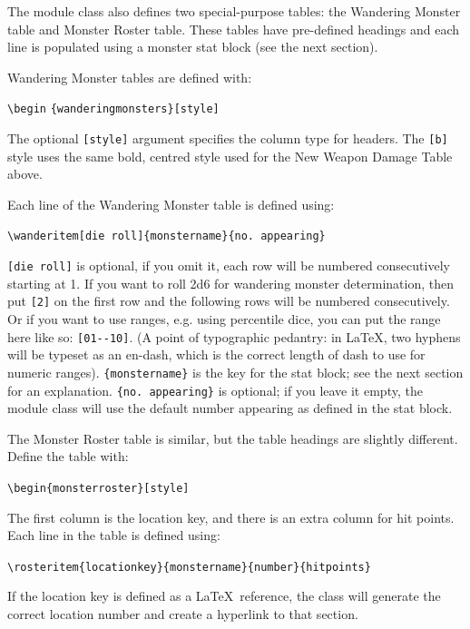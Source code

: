 \documentclass[letterpaper,serif]{module}
\begin{document}
\vspace{1em}\noindent The module class also defines two special-purpose tables: the Wandering Monster table and Monster Roster table. These tables
have pre-defined headings and each line is populated using a monster stat block (see the next section).

Wandering Monster tables are defined with:
\begin{statblockfreestyle}
\verb|\begin| \verb|{wanderingmonsters}[style]|
\end{statblockfreestyle}
The optional \verb|[style]| argument specifies the column type for headers. The \verb|[b]| style uses the same bold,
centred style used for the New Weapon Damage Table above.

Each line of the Wandering Monster table is defined using:
\begin{statblockfreestyle}
\noindent \verb|\wanderitem[die roll]{monstername}{no. appearing}|
\end{statblockfreestyle}
\verb|[die roll]| is optional, if you omit it, each row will be numbered consecutively starting at 1. If you want to
roll 2d6 for wandering monster determination, then put \verb|[2]| on the first row and the following rows will be numbered
consecutively. Or if you want to use ranges, e.g. using percentile dice, you can put the range here like so: \verb|[01--10]|.
(A point of typographic pedantry: in \LaTeX, two hyphens will be typeset as an en-dash, which is the correct length of dash to
use for numeric ranges). \verb|{monstername}| is the key for the stat block; see the next section for an explanation.
\verb|{no. appearing}| is optional; if you leave it empty, the module class will use the default number appearing as defined in the stat block.

The Monster Roster table is similar, but the table headings are slightly different. Define the table with:
\begin{statblockfreestyle}
\noindent \verb|\begin{monsterroster}[style]|
\end{statblockfreestyle}
The first column is the location key, and there is an extra column for hit points. Each line in
the table is defined using:
\begin{statblockfreestyle}
\hspace{-1em}\verb|\rosteritem{locationkey}{monstername}{number}{hitpoints}|
\end{statblockfreestyle}
If the location key is defined as a \LaTeX~reference, the class will generate the correct location number and create a hyperlink to that section.
\end{document}

